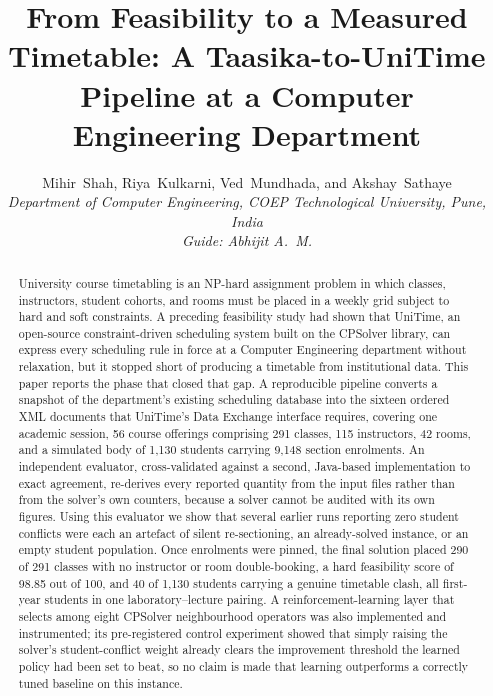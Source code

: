 \documentclass[journal]{IEEEtran}
\begin{document}
\title{From Feasibility to a Measured Timetable: A Taasika-to-UniTime Pipeline at a Computer Engineering Department}

\author{Mihir~Shah, Riya~Kulkarni, Ved~Mundhada, and Akshay~Sathaye\\
\textit{Department of Computer Engineering, COEP Technological University, Pune, India}\\
\textit{Guide: Abhijit A.\ M.}}


\maketitle

\begin{abstract}
University course timetabling is an NP-hard assignment problem in which classes, instructors, student cohorts, and rooms must be placed in a weekly grid subject to hard and soft constraints. A preceding feasibility study had shown that UniTime, an open-source constraint-driven scheduling system built on the CPSolver library, can express every scheduling rule in force at a Computer Engineering department without relaxation, but it stopped short of producing a timetable from institutional data. This paper reports the phase that closed that gap. A reproducible pipeline converts a snapshot of the department's existing scheduling database into the sixteen ordered XML documents that UniTime's Data Exchange interface requires, covering one academic session, 56 course offerings comprising 291 classes, 115 instructors, 42 rooms, and a simulated body of 1{,}130 students carrying 9{,}148 section enrolments. An independent evaluator, cross-validated against a second, Java-based implementation to exact agreement, re-derives every reported quantity from the input files rather than from the solver's own counters, because a solver cannot be audited with its own figures. Using this evaluator we show that several earlier runs reporting zero student conflicts were each an artefact of silent re-sectioning, an already-solved instance, or an empty student population. Once enrolments were pinned, the final solution placed 290 of 291 classes with no instructor or room double-booking, a hard feasibility score of 98.85 out of 100, and 40 of 1{,}130 students carrying a genuine timetable clash, all first-year students in one laboratory--lecture pairing. A reinforcement-learning layer that selects among eight CPSolver neighbourhood operators was also implemented and instrumented; its pre-registered control experiment showed that simply raising the solver's student-conflict weight already clears the improvement threshold the learned policy had been set to beat, so no claim is made that learning outperforms a correctly tuned baseline on this instance.
\end{abstract}
\end{document}
